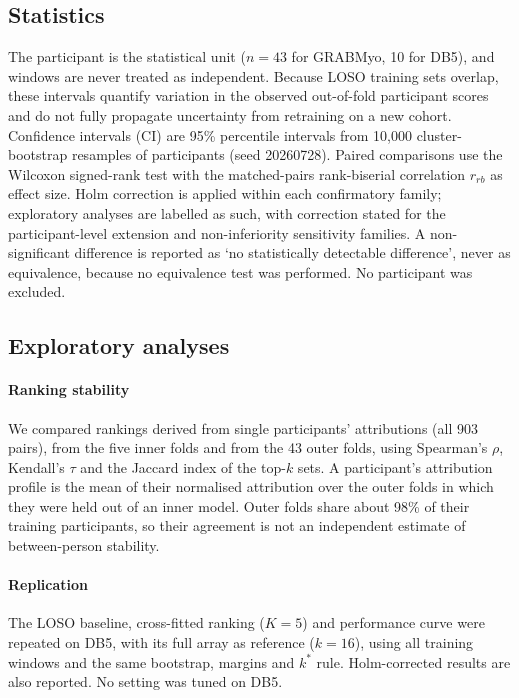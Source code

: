 \subsection{Statistics}
The participant is the statistical unit ($n = 43$ for GRABMyo, 10 for DB5), and windows are never treated as independent. Because LOSO training sets overlap, these intervals quantify variation in the observed out-of-fold participant scores and do not fully propagate uncertainty from retraining on a new cohort. Confidence intervals (CI) are 95\% percentile intervals from 10,000 cluster-bootstrap resamples of participants (seed 20260728). Paired comparisons use the Wilcoxon signed-rank test with the matched-pairs rank-biserial correlation $r_{rb}$ as effect size. Holm correction is applied within each confirmatory family; exploratory analyses are labelled as such, with correction stated for the participant-level extension and non-inferiority sensitivity families. A non-significant difference is reported as `no statistically detectable difference', never as equivalence, because no equivalence test was performed. No participant was excluded.

\subsection{Exploratory analyses}
\paragraph{Ranking stability} We compared rankings derived from single participants' attributions (all 903 pairs), from the five inner folds and from the 43 outer folds, using Spearman's $\rho$, Kendall's $\tau$ and the Jaccard index of the top-$k$ sets. A participant's attribution profile is the mean of their normalised attribution over the outer folds in which they were held out of an inner model. Outer folds share about 98\% of their training participants, so their agreement is not an independent estimate of between-person stability.

\paragraph{Replication} The LOSO baseline, cross-fitted ranking ($K = 5$) and performance curve were repeated on DB5, with its full array as reference ($k = 16$), using all training windows and the same bootstrap, margins and $k^*$ rule. Holm-corrected results are also reported. No setting was tuned on DB5.


